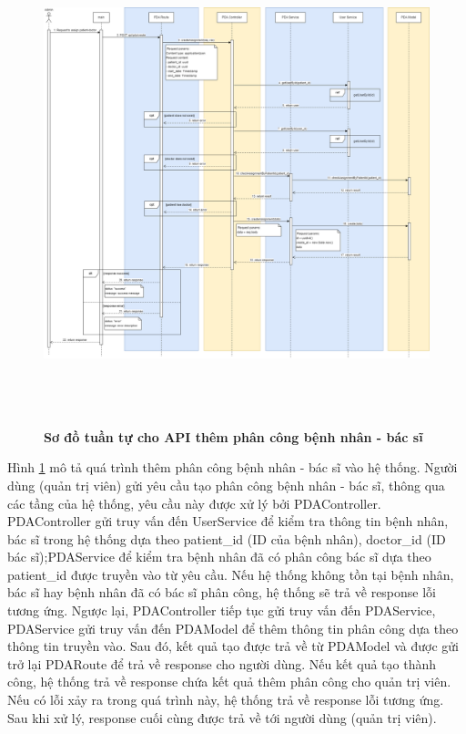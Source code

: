 \begin{figure}[H]
  \centering
  \includegraphics[width=16cm,height=14cm]{Images/sequence_api/addAssignment.png}
  \caption[Sơ đồ tuần tự cho API thêm phân công bệnh nhân - bác sĩ]{\bfseries \fontsize{12pt}{0pt}
  \selectfont Sơ đồ tuần tự cho API thêm phân công bệnh nhân - bác sĩ }
  \label{api_addPDA} %
\end{figure}
Hình \ref{api_addPDA} mô tả quá trình thêm phân công bệnh nhân - bác sĩ vào hệ thống. Người dùng (quản trị viên) gửi yêu cầu tạo phân công bệnh nhân - bác sĩ, thông qua các tầng của hệ thống, 
yêu cầu này được xử lý bởi PDAController. PDAController gửi truy vấn đến UserService để kiểm tra thông tin bệnh nhân, bác sĩ trong hệ thống dựa theo patient\_id (ID của bệnh nhân), doctor\_id (ID bác sĩ);PDAService để kiểm
tra bệnh nhân đã có phân công bác sĩ dựa theo patient\_id được truyền vào từ yêu cầu. Nếu hệ thống không tồn tại bệnh nhân, bác sĩ hay bệnh nhân đã có bác sĩ phân công, hệ thống sẽ trả về response lỗi tương ứng. 
Ngược lại, PDAController tiếp tục gửi truy vấn đến PDAService, PDAService gửi truy vấn đến PDAModel để thêm thông tin phân công dựa theo thông tin truyền vào. Sau đó, kết quả tạo được trả về từ PDAModel và được gửi trở lại 
PDARoute để trả về response cho người dùng. Nếu kết quả tạo thành công, hệ thống trả về response chứa kết quả thêm phân công cho quản trị viên. 
Nếu có lỗi xảy ra trong quá trình này, hệ thống trả về response lỗi tương ứng. Sau khi xử lý, response cuối cùng được trả về tới người dùng (quản trị viên).


